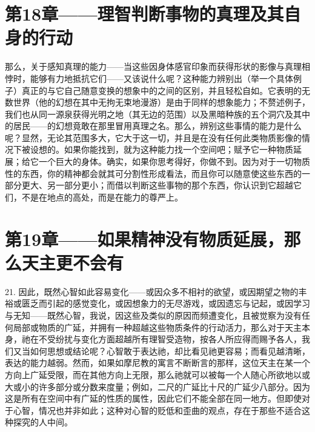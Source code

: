 
\section{第18章——理智判断事物的真理及其自身的行动}

那么，关于感知真理的能力——当这些因身体感官印象而获得形状的影像与真理相悖时，能够有力地抵抗它们——又该说什么呢？这种能力辨别出（举一个具体例子）真正的与它自己随意变换的想象中的之间的区别，并且轻松自如。它表明的无数世界（他的幻想在其中无拘无束地漫游）是由于同样的想象能力；不赘述例子，我们也从同一源泉获得光明之地（其无边的范围）以及黑暗种族的五个洞穴及其中的居民——的幻想竟敢在那里冒用真理之名。那么，辨别这些事情的能力是什么呢？显然，无论其范围多大，它大于这一切，并且是在没有任何此类物质影像的情况下被设想的。如果你能找到，就为这种能力找一个空间吧；赋予它一种物质延展；给它一个巨大的身体。确实，如果你思考得好，你做不到。因为对于一切物质性的东西，你的精神都会就其可分割性形成看法，而且你可以随意使这些东西的一部分更大、另一部分更小；而借以判断这些事物的那个东西，你认识到它超越它们，不是在地点的高处，而是在能力的尊严上。\par


\section{第19章——如果精神没有物质延展，那么天主更不会有}

21. 因此，既然心智如此容易变化——或因众多不相衬的欲望，或因期望之物的丰裕或匮乏而引起的感觉变化，或因想象力的无尽游戏，或因遗忘与记起，或因学习与无知——既然心智，我说，因这些及类似的原因而频遭变化，且被觉察为没有任何局部或物质的广延，并拥有一种超越这些物质条件的行动活力，那么对于天主本身，祂在不受纷扰与变化方面超越所有理智受造物，按各人所应得而赐予各人，我们又当如何思想或结论呢？心智敢于表达祂，却比看见祂更容易；而看见越清晰，表达的能力越弱。然而，如果如摩尼教的寓言不断断言的那样，这位天主在某一个方向上广延受限，而在其他方向上无限，那么祂就可以被每一个人随心所欲地以或大或小的许多部分或分数来度量；例如，二尺的广延比十尺的广延少八部分。因为这是所有在空间中有广延的性质的属性，因此它们不能全部在同一地方。但即使对于心智，情况也并非如此；这种对心智的贬低和歪曲的观点，存在于那些不适合这种探究的人中间。\par


